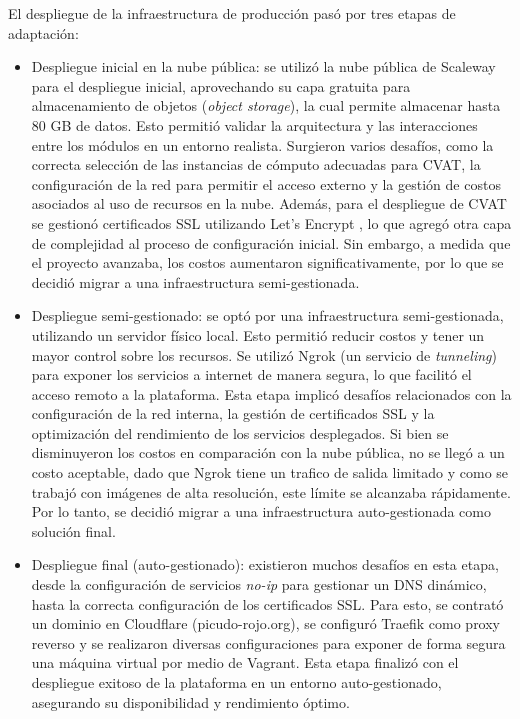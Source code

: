 El despliegue de la infraestructura de producción pasó por tres etapas de adaptación:

\begin{itemize}
  \item Despliegue inicial en la nube pública: se utilizó la nube pública de Scaleway para el despliegue inicial, aprovechando su capa gratuita para almacenamiento de objetos (\textit{object storage}), la cual permite almacenar hasta 80 GB de datos. Esto permitió validar la arquitectura y las interacciones entre los módulos en un entorno realista. Surgieron varios desafíos, como la correcta selección de las instancias de cómputo adecuadas para CVAT, la configuración de la red para permitir el acceso externo y la gestión de costos asociados al uso de recursos en la nube. Además, para el despliegue de CVAT se gestionó certificados SSL utilizando Let's Encrypt \citep{aas_lets_2019}, lo que agregó otra capa de complejidad al proceso de configuración inicial. Sin embargo, a medida que el proyecto avanzaba, los costos aumentaron significativamente, por lo que se decidió migrar a una infraestructura semi-gestionada.
  \item Despliegue semi-gestionado: se optó por una infraestructura semi-gestionada, utilizando un servidor físico local. Esto permitió reducir costos y tener un mayor control sobre los recursos. Se utilizó Ngrok \citep{ngrok_inc_ngrok_nodate} (un servicio de \textit{tunneling}) para exponer los servicios a internet de manera segura, lo que facilitó el acceso remoto a la plataforma. Esta etapa implicó desafíos relacionados con la configuración de la red interna, la gestión de certificados SSL y la optimización del rendimiento de los servicios desplegados. Si bien se disminuyeron los costos en comparación con la nube pública, no se llegó a un costo aceptable, dado que Ngrok tiene un trafico de salida limitado y como se trabajó con imágenes de alta resolución, este límite se alcanzaba rápidamente. Por lo tanto, se decidió migrar a una infraestructura auto-gestionada como solución final.
  \item Despliegue final (auto-gestionado): existieron muchos desafíos en esta etapa, desde la configuración de servicios \textit{no-ip} para gestionar un DNS dinámico, hasta la correcta configuración de los certificados SSL. Para esto, se contrató un dominio en Cloudflare  \citep{cloudflare_conecta_nodate} (picudo-rojo.org), se configuró Traefik \citep{traefik_labs_traefik_nodate} como proxy reverso y se realizaron diversas configuraciones para exponer de forma segura una máquina virtual por medio de Vagrant. Esta etapa finalizó con el despliegue exitoso de la plataforma en un entorno auto-gestionado, asegurando su disponibilidad y rendimiento óptimo.
\end{itemize}


